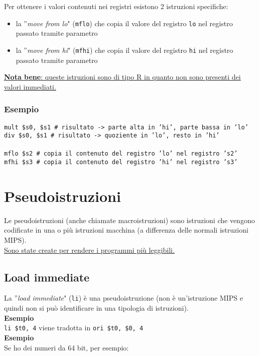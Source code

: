 \documentclass[../main.tex]{subfiles}
\begin{document}
\noindent
Per ottenere i valori contenuti nei registri esistono 2
istruzioni specifiche:
\begin{itemize}
    \item la ''\textit{move from lo}" (\texttt{mflo}) che copia il valore
    del registro \texttt{lo} nel registro passato tramite parametro
    \item la ''\textit{move from hi}" (\texttt{mfhi}) che copia il valore
    del registro \texttt{hi} nel registro passato tramite parametro
\end{itemize}

\vspace*{2mm}

\noindent
\underline{\textbf{Nota bene}: queste istruzioni sono di tipo R in quanto
non sono presenti dei valori immediati.}

\subsection*{Esempio}
\texttt{mult \$s0, \$s1 \# risultato -> parte alta in 'hi', parte bassa in 'lo'} \\
\texttt{div \hspace*{0cm} \$s0, \$s1 \# risultato -> quoziente in 'lo', resto in 'hi'}\\
\\
\texttt{mflo \$s2 \# copia il contenuto del registro 'lo' nel registro 's2'} \\
\texttt{mfhi \$s3 \# copia il contenuto del registro 'hi' nel registro 's3'}

\newpage

\chapter{Pseudoistruzioni}
Le pseudoistruzioni (anche chiamate macroistruzioni) sono istruzioni
che vengono codificate in una o più istruzioni macchina (a differenza
delle normali istruzioni MIPS). \\
\underline{Sono state create per rendere i programmi più leggibili.}

\section{Load immediate}
La ''\textit{load immediate}" (\texttt{li}) è una pseudoistruzione
(non è un'istruzione MIPS e quindi non si può identificare in una
tipologia di istruzioni).
\\[2mm]
\textbf{Esempio} \\
\texttt{li \$t0, 4} viene tradotta in \texttt{ori \$t0, \$0, 4}
\\[2mm]
\textbf{Esempio} \\
Se ho dei numeri da 64 bit, per esempio:
\end{document}
